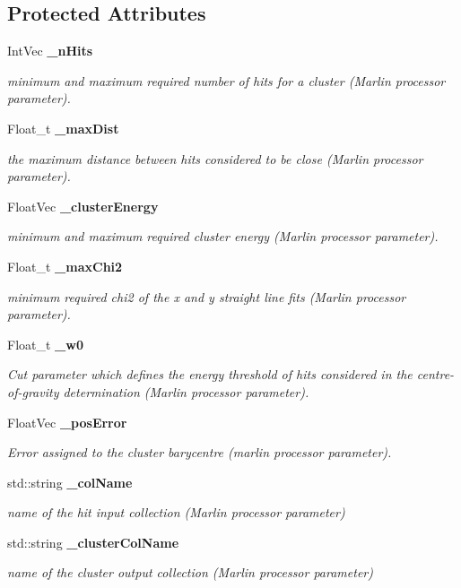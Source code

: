 \subsection*{Protected Attributes}
\begin{DoxyCompactItemize}
\item 
Int\-Vec {\bf \-\_\-n\-Hits}
\begin{DoxyCompactList}\small\item\em minimum and maximum required number of hits for a cluster (Marlin processor parameter). \end{DoxyCompactList}\item 
Float\-\_\-t {\bf \-\_\-max\-Dist}
\begin{DoxyCompactList}\small\item\em the maximum distance between hits considered to be close (Marlin processor parameter). \end{DoxyCompactList}\item 
Float\-Vec {\bf \-\_\-cluster\-Energy}
\begin{DoxyCompactList}\small\item\em minimum and maximum required cluster energy (Marlin processor parameter). \end{DoxyCompactList}\item 
Float\-\_\-t {\bf \-\_\-max\-Chi2}
\begin{DoxyCompactList}\small\item\em minimum required chi2 of the x and y straight line fits (Marlin processor parameter). \end{DoxyCompactList}\item 
Float\-\_\-t {\bf \-\_\-w0}
\begin{DoxyCompactList}\small\item\em Cut parameter which defines the energy threshold of hits considered in the centre-\/of-\/gravity determination (Marlin processor parameter). \end{DoxyCompactList}\item 
Float\-Vec {\bf \-\_\-pos\-Error}
\begin{DoxyCompactList}\small\item\em Error assigned to the cluster barycentre (marlin processor parameter). \end{DoxyCompactList}\item 
std\-::string {\bf \-\_\-col\-Name}\label{classCALICE_1_1MipSelect_ac9ae37843e4f13fdb0339917b36e3bb9}

\begin{DoxyCompactList}\small\item\em name of the hit input collection (Marlin processor parameter) \end{DoxyCompactList}\item 
std\-::string {\bf \-\_\-cluster\-Col\-Name}\label{classCALICE_1_1MipSelect_ad9094c81faee001d8cb848cbd0da5ac4}

\begin{DoxyCompactList}\small\item\em name of the cluster output collection (Marlin processor parameter) \end{DoxyCompactList}\end{DoxyCompactItemize}
